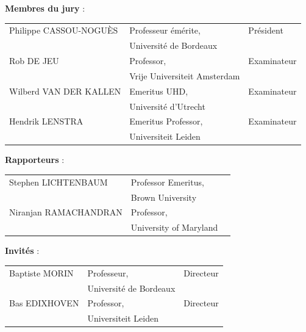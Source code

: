 \vspace{\fill}

\begingroup\small
\noindent \textbf{Membres du jury} :

\vspace{0.5em}

\noindent\begin{tabular}{p{5cm}p{4cm}l}
           Philippe CASSOU-NOGUÈS & Professeur émérite, & Président \\
                                  & Université de Bordeaux & \\
           \rule{0pt}{1.2em}Rob DE JEU & Professor, & Examinateur \\
                                  & Vrije Universiteit Amsterdam \\
           \rule{0pt}{1.2em}Wilberd VAN DER KALLEN & Emeritus UHD, & Examinateur \\
                                  & Université d'Utrecht \\
           \rule{0pt}{1.2em}Hendrik LENSTRA & Emeritus Professor, & Examinateur \\
                                  & Universiteit Leiden
\end{tabular}

\noindent \textbf{Rapporteurs} :

\vspace{0.5em}

\noindent\begin{tabular}{p{5cm}p{4cm}l}
           \rule{0pt}{1.2em}Stephen LICHTENBAUM & Professor Emeritus, & \\
                                                & Brown University & \\
           \rule{0pt}{1.2em}Niranjan RAMACHANDRAN & Professor, & \\
                                                & University of Maryland
\end{tabular}

\noindent \textbf{Invités} :

\vspace{0.5em}

\noindent\begin{tabular}{p{5cm}p{4cm}l}
           \rule{0pt}{1.2em}Baptiste MORIN & Professeur, & Directeur \\
                                           & Université de Bordeaux & \\
           \rule{0pt}{1.2em}Bas EDIXHOVEN & Professor, & Directeur \\
                                           & Universiteit Leiden & 
\end{tabular}
\endgroup

\endgroup
